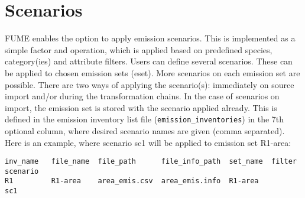 \documentclass[a4paper,11pt]{article}
\begin{document}
\section{Scenarios}\label{scenario}
FUME enables the option to apply emission scenarios. This is implemented as a simple factor and operation, which is applied based on predefined species, category(ies) and attribute filters.  Users can define several scenarios. These can be applied to chosen emission sets (eset). More scenarios on each emission set are possible. There are two ways of applying the scenario(s): immediately on source import and/or during the transformation chains. In the case of scenarios on import, the emission set is stored with the scenario applied already. This is defined in the emission inventory list file (\verb|emission_inventories|) in the 7th optional column, where desired scenario names are given (comma separated). Here is an example, where scenario sc1 will be applied to emission set R1-area:
\begin{verbatim}
inv_name   file_name  file_path      file_info_path  set_name  filter  scenario
R1         R1-area    area_emis.csv  area_emis.info  R1-area           sc1
\end{verbatim}
\end{document}
